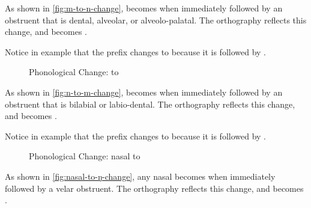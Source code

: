 As shown in \autoref{fig:m-to-n-change},  becomes  when immediately followed by an obstruent that is dental, alveolar, or alveolo-palatal. The orthography reflects this change, and  becomes .

	    
	\a<m-n>    
\xe

Notice in example  that the prefix  changes to  because it is followed by .

\begin{figure}[h]\centering
	\caption{Phonological Change:  to }
	\label{fig:n-to-m-change}
\end{figure}

As shown in \autoref{fig:n-to-m-change},  becomes  when immediately followed by an obstruent that is bilabial or labio-dental. The orthography reflects this change, and  becomes .

	    
	\a<n-m>    
\xe

Notice in example  that the prefix  changes to  because it is followed by .

\begin{figure}[h]\centering
	\caption{Phonological Change: nasal to }
	\label{fig:nasal-to-ŋ-change}
\end{figure}

As shown in \autoref{fig:nasal-to-ŋ-change}, any nasal becomes  when immediately followed by a velar obstruent. The orthography reflects this change, and  becomes .

	   
	\a<n-ŋ>    
\xe

